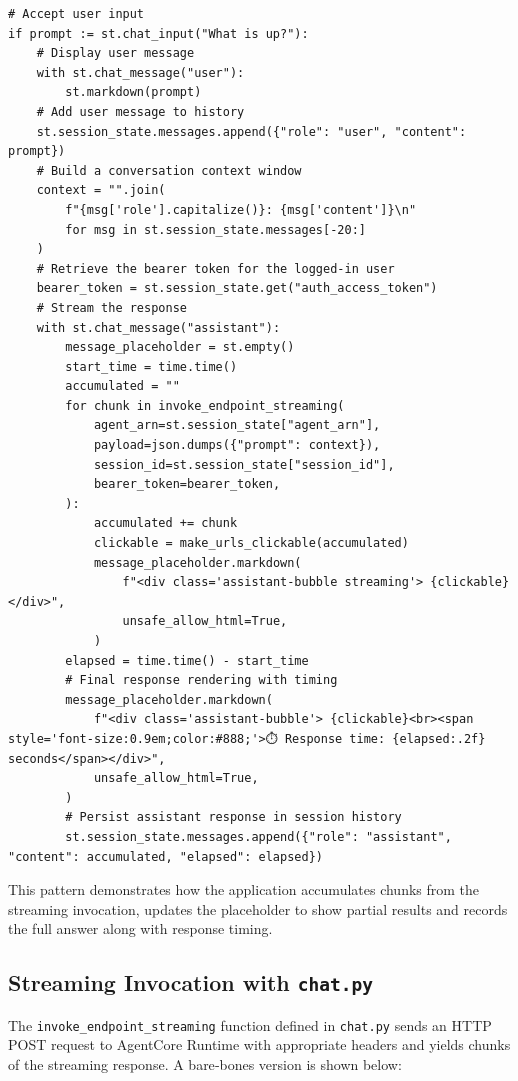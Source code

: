 \begin{lstlisting}
# Accept user input
if prompt := st.chat_input("What is up?"):
    # Display user message
    with st.chat_message("user"):
        st.markdown(prompt)
    # Add user message to history
    st.session_state.messages.append({"role": "user", "content": prompt})
    # Build a conversation context window
    context = "".join(
        f"{msg['role'].capitalize()}: {msg['content']}\n"
        for msg in st.session_state.messages[-20:]
    )
    # Retrieve the bearer token for the logged‑in user
    bearer_token = st.session_state.get("auth_access_token")
    # Stream the response
    with st.chat_message("assistant"):
        message_placeholder = st.empty()
        start_time = time.time()
        accumulated = ""
        for chunk in invoke_endpoint_streaming(
            agent_arn=st.session_state["agent_arn"],
            payload=json.dumps({"prompt": context}),
            session_id=st.session_state["session_id"],
            bearer_token=bearer_token,
        ):
            accumulated += chunk
            clickable = make_urls_clickable(accumulated)
            message_placeholder.markdown(
                f"<div class='assistant-bubble streaming'> {clickable}</div>",
                unsafe_allow_html=True,
            )
        elapsed = time.time() - start_time
        # Final response rendering with timing
        message_placeholder.markdown(
            f"<div class='assistant-bubble'> {clickable}<br><span style='font-size:0.9em;color:#888;'>⏱️ Response time: {elapsed:.2f} seconds</span></div>",
            unsafe_allow_html=True,
        )
        # Persist assistant response in session history
        st.session_state.messages.append({"role": "assistant", "content": accumulated, "elapsed": elapsed})

\end{lstlisting}

This pattern demonstrates how the application accumulates chunks from
the streaming invocation, updates the placeholder to show partial
results and records the full answer along with response timing.

\subsection{Streaming Invocation with \texttt{chat.py}}

The \texttt{invoke\_endpoint\_streaming} function defined in
\texttt{chat.py} sends an HTTP POST request to AgentCore Runtime with
appropriate headers and yields chunks of the streaming response.  A
bare‑bones version is shown below:

